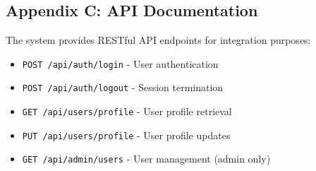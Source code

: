 \documentclass[12pt,a4paper]{article}
\begin{document}
\subsection{Appendix C: API Documentation}
The system provides RESTful API endpoints for integration purposes:
\begin{itemize}
    \item \texttt{POST /api/auth/login} - User authentication
    \item \texttt{POST /api/auth/logout} - Session termination
    \item \texttt{GET /api/users/profile} - User profile retrieval
    \item \texttt{PUT /api/users/profile} - User profile updates
    \item \texttt{GET /api/admin/users} - User management (admin only)
\end{itemize}
\end{document}
